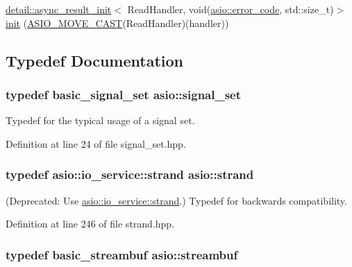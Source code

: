 \begin{DoxyCompactItemize}
\item 
\hyperlink{structasio_1_1detail_1_1async__result__init}{detail\+::async\+\_\+result\+\_\+init}$<$ Read\+Handler, void(\hyperlink{classasio_1_1error__code}{asio\+::error\+\_\+code}, std\+::size\+\_\+t)$>$ \hyperlink{namespaceasio_abae608ba848ec0b5f26a2e6f213dcf6d}{init} (\hyperlink{config_8hpp_a746be5b8f1f4110bc1e7a836afa08ee4}{A\+S\+I\+O\+\_\+\+M\+O\+V\+E\+\_\+\+C\+A\+S\+T}(Read\+Handler)(handler))
\end{DoxyCompactItemize}


\subsection{Typedef Documentation}
\hypertarget{namespaceasio_a4f135fc124cc60e4e00dc2dbb309f354}{}
\subsubsection[{signal\+\_\+set}]{\setlength{\rightskip}{0pt plus 5cm}typedef {\bf basic\+\_\+signal\+\_\+set} {\bf asio\+::signal\+\_\+set}}\label{namespaceasio_a4f135fc124cc60e4e00dc2dbb309f354}


Typedef for the typical usage of a signal set. 



Definition at line 24 of file signal\+\_\+set.\+hpp.

\hypertarget{namespaceasio_a3be3fa00c86ab58ba41aabe8fcbf11be}{}
\subsubsection[{strand}]{\setlength{\rightskip}{0pt plus 5cm}typedef {\bf asio\+::io\+\_\+service\+::strand} {\bf asio\+::strand}}\label{namespaceasio_a3be3fa00c86ab58ba41aabe8fcbf11be}
(Deprecated\+: Use \hyperlink{classasio_1_1io__service_1_1strand}{asio\+::io\+\_\+service\+::strand}.) Typedef for backwards compatibility. 

Definition at line 246 of file strand.\+hpp.

\hypertarget{namespaceasio_a6a7ba348943527312eeace3492bf32ee}{}
\subsubsection[{streambuf}]{\setlength{\rightskip}{0pt plus 5cm}typedef {\bf basic\+\_\+streambuf} {\bf asio\+::streambuf}}\label{namespaceasio_a6a7ba348943527312eeace3492bf32ee}


